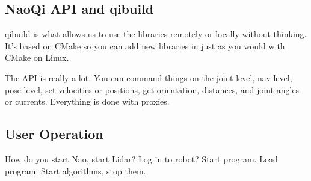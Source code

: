 \subsection{NaoQi API and qibuild}
qibuild is what allows us to use the libraries remotely or locally without thinking. It's based on CMake
so you can add new libraries in just as you would with CMake on Linux.

The API is really a lot. You can command things on the joint level, nav level, pose level,
set velocities or positions, get orientation, distances, and joint angles or currents.
Everything is done with proxies.

\subsection{User Operation}
How do you start Nao, start Lidar? Log in to robot? Start program. Load program.
Start algorithms, stop them.
			


